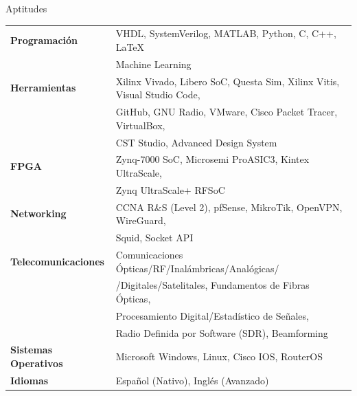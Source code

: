 \documentclass{resume} %
\begin{document}
\begin{rSection}{Aptitudes}

    \begin{tabular}{ @{} >{\bfseries}l @{\hspace{6ex}} l }
        Programación        & VHDL, SystemVerilog, MATLAB, Python, C, C++, \LaTeX                      \\
                            & Machine Learning                                                         \\
        Herramientas        & Xilinx Vivado, Libero SoC, Questa Sim, Xilinx Vitis, Visual Studio Code, \\
                            & GitHub, GNU Radio, VMware, Cisco Packet Tracer, VirtualBox,              \\
                            & CST Studio, Advanced Design System                                       \\
        FPGA                & Zynq-7000 SoC, Microsemi ProASIC3, Kintex UltraScale,                    \\
                            & Zynq UltraScale+ RFSoC                                                   \\
        Networking          & CCNA R\&S (Level 2), pfSense, MikroTik, OpenVPN, WireGuard,              \\
                            & Squid, Socket API                                                        \\
        Telecomunicaciones  & Comunicaciones Ópticas/RF/Inalámbricas/Analógicas/                       \\ & /Digitales/Satelitales, Fundamentos de Fibras Ópticas, \\ & Procesamiento Digital/Estadístico de Señales, \\
                            & Radio Definida por Software (SDR), Beamforming                           \\
        Sistemas Operativos & Microsoft Windows, Linux, Cisco IOS, RouterOS                            \\
        Idiomas             & Español (Nativo), Inglés (Avanzado)
    \end{tabular}

\end{rSection}

\clearpage
\end{document}
